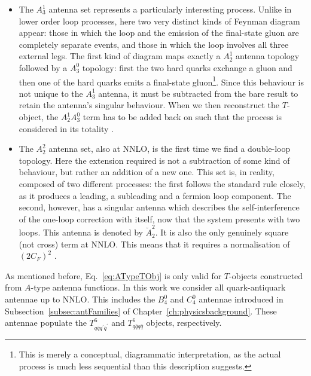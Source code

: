 \begin{itemize}
    \item The $A_3^1$ antenna set represents a particularly interesting process.
    Unlike in lower order loop processes, here two very distinct kinds of
    Feynman diagram appear: those in which the loop and the emission of the
    final-state gluon are completely separate events, and those in which the
    loop involves all three external legs. The first kind of diagram maps exactly
    a $A_2^1$ antenna topology followed by a $A_3^0$ topology: first the two hard
    quarks exchange a gluon and then one of the hard quarks emits a final-state
    gluon\footnote{This is merely a conceptual, diagrammatic interpretation,
    as the actual process is much less sequential than this description suggests.}.
    Since this behaviour is not unique to the $A_3^1$ antenna, it must
    be subtracted from the bare result to retain the antenna's singular behaviour.
    When we then reconstruct the $T$-object, the $A_2^1A_3^0$ term has to be
    added back on such that the process is considered in its totality \cite{Gehrmann-DeRidder:2005btv}.
    \item The $A_2^2$ antenna set, also at NNLO, is the first time we find a
    double-loop topology. Here the extension required is not a subtraction of
    some kind of behaviour, but rather an addition of a new one. This set is, in
    reality, composed of two different processes: the first follows the standard
    rule closely, as it produces a leading, a subleading and a fermion loop
    component. The second, however, has a singular antenna which describes the
    self-interference of the one-loop correction with itself, now that the system
    presents with two loops.
    This antenna is denoted by $\breve A_2^2$. It is also the only
    genuinely square (not cross) term at NNLO. This means that it requires a
    normalisation of $(2C_F)^2$ \cite{Gehrmann-DeRidder:2005btv}.
\end{itemize}

As mentioned before, Eq.~\eqref{eq:ATypeTObj} is only valid for
$T$-objects constructed from $A$-type antenna functions. In this work we consider
all quark-antiquark antennae up to NNLO. This includes the $B_4^0$ and $C_4^0$ antennae
introduced in Subsection~\ref{subsec:antFamilies} of Chapter~\ref{ch:physicsbackground}. These
antennae populate the $T_{q\bar qq^\prime\bar q^\prime}^6$ and $T_{q\bar qq\bar q}^6$
objects, respectively.

